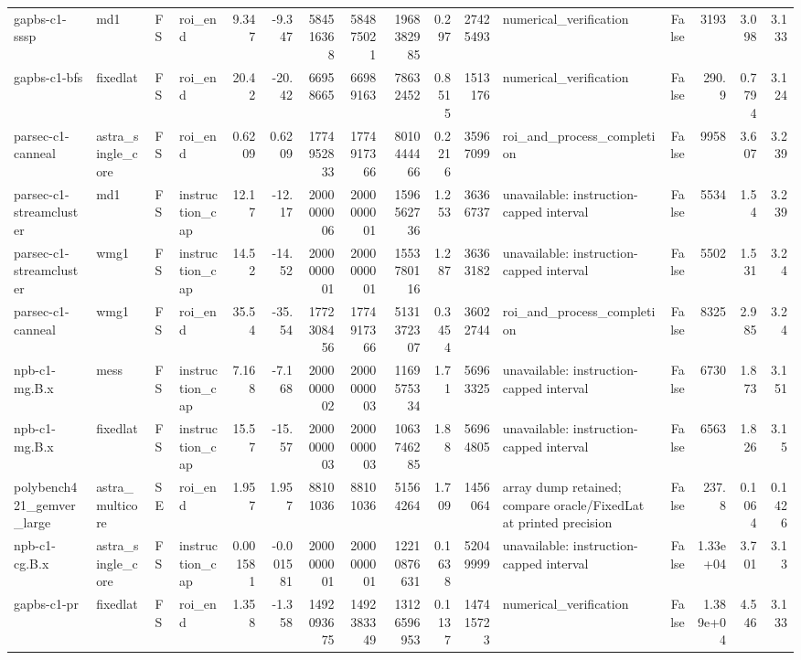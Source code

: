 \begin{tabular}{llllrrrrrrrlrrrr}
gapbs-c1-sssp & md1 & FS & roi\_end & 9.347 & -9.347 & 584516368 & 584875021 & 1968382985 & 0.297 & 27425493 & numerical\_verification & False & 3193 & 3.098 & 3.133 \\
gapbs-c1-bfs & fixedlat & FS & roi\_end & 20.42 & -20.42 & 66958665 & 66989163 & 78632452 & 0.8515 & 1513176 & numerical\_verification & False & 290.9 & 0.7794 & 3.124 \\
parsec-c1-canneal & astra\_single\_core & FS & roi\_end & 0.6209 & 0.6209 & 1774952833 & 1774917366 & 8010444466 & 0.2216 & 35967099 & roi\_and\_process\_completion & False & 9958 & 3.607 & 3.239 \\
parsec-c1-streamcluster & md1 & FS & instruction\_cap & 12.17 & -12.17 & 2000000006 & 2000000001 & 1596562736 & 1.253 & 36366737 & unavailable: instruction-capped interval & False & 5534 & 1.54 & 3.239 \\
parsec-c1-streamcluster & wmg1 & FS & instruction\_cap & 14.52 & -14.52 & 2000000001 & 2000000001 & 1553780116 & 1.287 & 36363182 & unavailable: instruction-capped interval & False & 5502 & 1.531 & 3.24 \\
parsec-c1-canneal & wmg1 & FS & roi\_end & 35.54 & -35.54 & 1772308456 & 1774917366 & 5131372307 & 0.3454 & 36022744 & roi\_and\_process\_completion & False & 8325 & 2.985 & 3.24 \\
npb-c1-mg.B.x & mess & FS & instruction\_cap & 7.168 & -7.168 & 2000000002 & 2000000003 & 1169575334 & 1.71 & 56963325 & unavailable: instruction-capped interval & False & 6730 & 1.873 & 3.151 \\
npb-c1-mg.B.x & fixedlat & FS & instruction\_cap & 15.57 & -15.57 & 2000000003 & 2000000003 & 1063746285 & 1.88 & 56964805 & unavailable: instruction-capped interval & False & 6563 & 1.826 & 3.15 \\
polybench421\_gemver\_large & astra\_multicore & SE & roi\_end & 1.957 & 1.957 & 88101036 & 88101036 & 51564264 & 1.709 & 1456064 & array dump retained; compare oracle/FixedLat at printed precision & False & 237.8 & 0.1064 & 0.1426 \\
npb-c1-cg.B.x & astra\_single\_core & FS & instruction\_cap & 0.001581 & -0.001581 & 2000000001 & 2000000001 & 12210876631 & 0.1638 & 52049999 & unavailable: instruction-capped interval & False & 1.33e+04 & 3.701 & 3.13 \\
gapbs-c1-pr & fixedlat & FS & roi\_end & 1.358 & -1.358 & 1492093675 & 1492383349 & 13126596953 & 0.1137 & 147415723 & numerical\_verification & False & 1.389e+04 & 4.546 & 3.133 \\

\end{tabular}
